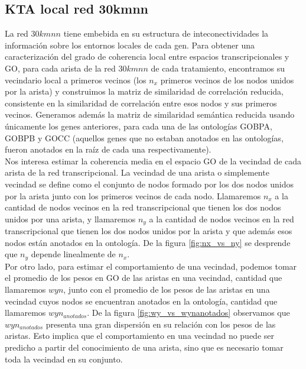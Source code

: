 \subsection{KTA local red 30kmnn}
La red $30kmnn$ tiene embebida en su estructura de inteconectividades la información sobre los entornos locales de cada gen. Para obtener una caracterización del grado de coherencia local entre espacios transcripcionales y GO, para cada arista de la red $30kmnn$ de cada tratamiento, encontramos su vecindario local a primeros vecinos (los $n_x$ primeros vecinos de los nodos unidos por la arista) y construimos la matriz de similaridad de correlación reducida, consistente en la similaridad de correlación entre esos nodos y sus primeros vecinos. Generamos además la matriz de similaridad semántica reducida usando únicamente los genes anteriores, para cada una de las ontologías GOBPA, GOBPB y GOCC (aquellos genes que no estaban anotados en las ontologías, fueron anotados en la raíz de cada una respectivamente).\\
Nos interesa estimar la coherencia media en el espacio GO de la vecindad de cada arista de la red transcripcional. La  vecindad de una arista o simplemente vecindad se define como el conjunto de nodos formado por los dos nodos unidos por la arista junto con los primeros vecinos de cada nodo. Llamaremos $n_x$ a la cantidad de nodos vecinos en la red transcripcional que tienen los dos nodos unidos por una arista, y llamaremos $n_y$ a la cantidad de nodos vecinos en la red transcripcional que tienen los dos nodos unidos por la arista y que además esos nodos están anotados en la ontología. De la figura \ref{fig:nx_vs_ny} se desprende que $n_y$ depende linealmente de $n_x$.\\
Por otro lado, para estimar el comportamiento de una vecindad, podemos tomar el promedio de los pesos en GO de las aristas en una vecindad, cantidad que llamaremos $wyn$, junto con el promedio de los pesos de las aristas en una vecindad cuyos nodos se encuentran anotados en la ontología, cantidad que llamaremos $wyn_{anotados}$. De la figura \ref{fig:wy_vs_wynanotados} observamos que $wyn_{anotados}$ presenta una gran dispersión en su relación con los pesos de las aristas. Esto implica que el comportamiento en una vecindad no puede ser predicho a partir del conocimiento de una arista, sino que es necesario tomar toda la vecindad en su conjunto.
